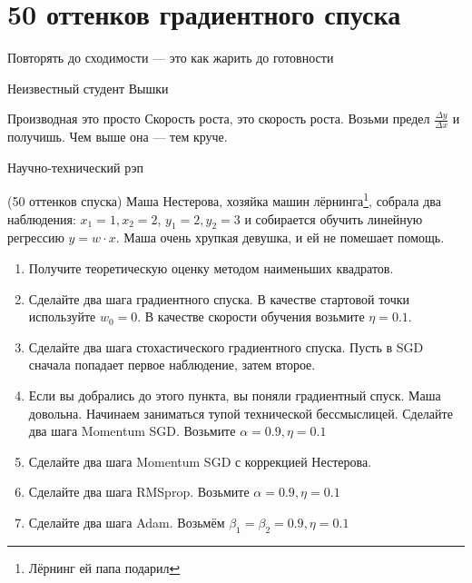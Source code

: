 
\section*{50 оттенков градиентного спуска}

\epigraph{Повторять до сходимости --- это как жарить до готовности}{Неизвестный студент Вышки}

\epigraph{Производная это просто \newline Скорость роста, это скорость роста. \newline Возьми предел $\frac{\Delta y}{\Delta x}$ и получишь. \newline Чем выше она --- тем круче.}{Научно-технический рэп}


\begin{problem}{(50 оттенков спуска)}
	Маша Нестерова, хозяйка машин лёрнинга\footnote{Лёрнинг ей папа подарил},  собрала два наблюдения: $x_1 = 1, x_2 = 2$, $y_1 = 2, y_2 = 3$ и собирается обучить линейную регрессию $y = w \cdot x$.  Маша очень хрупкая девушка, и ей не помешает помощь. 

	\begin{enumerate}
		\item Получите теоретическую оценку методом наименьших квадратов.
		
		\item  Сделайте два шага градиентного спуска. В качестве стартовой точки используйте $w_0 = 0$.  В качестве скорости обучения возьмите $\eta = 0.1$. 
		
		\item Сделайте два шага стохастического градиентного спуска.  Пусть в SGD сначала попадает первое наблюдение, затем второе. 
		
		\item Если вы добрались до этого пункта, вы поняли градиентный спуск. Маша довольна. Начинаем заниматься тупой технической бессмыслицей. Сделайте два шага Momentum SGD. Возьмите $\alpha = 0.9, \eta = 0.1$
		
		\item  Сделайте два шага Momentum SGD с коррекцией Нестерова. 
		
		\item Сделайте два шага RMSprop.  Возьмите $\alpha = 0.9, \eta = 0.1$
		
		\item  Сделайте два шага Adam. Возьмём  $\beta_1 = \beta_2 = 0.9, \eta = 0.1$		
	\end{enumerate}
\end{problem}



